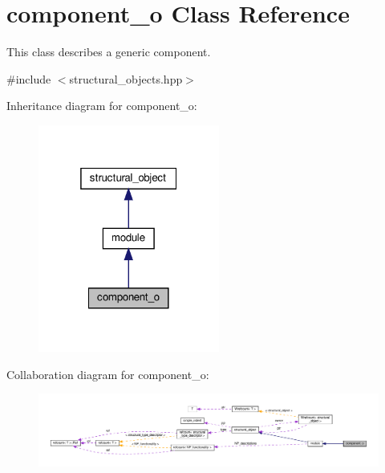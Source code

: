 \hypertarget{classcomponent__o}{}\section{component\+\_\+o Class Reference}
\label{classcomponent__o}


This class describes a generic component.  




{\ttfamily \#include $<$structural\+\_\+objects.\+hpp$>$}



Inheritance diagram for component\+\_\+o\+:
\nopagebreak
\begin{figure}[H]
\begin{center}
\leavevmode
\includegraphics[width=169pt]{df/d53/classcomponent__o__inherit__graph}
\end{center}
\end{figure}


Collaboration diagram for component\+\_\+o\+:
\nopagebreak
\begin{figure}[H]
\begin{center}
\leavevmode
\includegraphics[width=350pt]{d1/dfe/classcomponent__o__coll__graph}
\end{center}
\end{figure}
